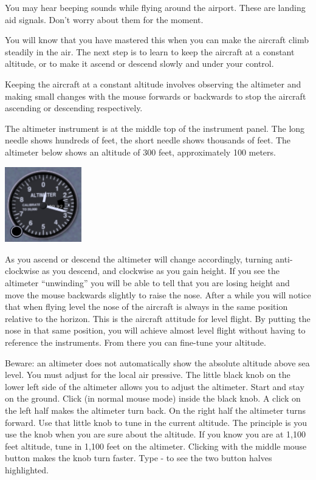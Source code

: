 You may hear beeping sounds while flying around the airport. These are
landing aid signals. Don't worry about them for the
moment.

You will know that you have mastered this when you can make the aircraft climb
steadily in the air. The next step is to learn to keep the aircraft at a 
constant altitude, or to make it ascend or descend slowly and under your 
control.

Keeping the aircraft at a constant altitude involves observing the altimeter
and making small changes with the mouse forwards or backwards to stop the 
aircraft ascending or descending respectively.

 The altimeter instrument is at the middle top of the 
instrument panel. The long needle shows hundreds of feet, the short needle 
shows thousands of feet. The altimeter below shows an altitude of
300 feet, approximately 100 meters.


\begin{center}
\includegraphics[width=0.25\textwidth]{img/tut_17}
\end{center}

As you ascend or descend the altimeter will change accordingly, turning 
anti-clockwise as you descend, and clockwise as you gain height. If you see
the altimeter ``unwinding'' you will be able to tell that you are losing height
and move the mouse backwards slightly to raise the nose.
After a while you will notice that when flying level the nose of the aircraft
is always in the same position relative to the horizon. This is the aircraft
attitude for level flight. By putting the nose in that same position, you will
achieve almost level flight without having to reference the instruments. From
there you can fine-tune your altitude.

Beware: an altimeter does not automatically show the absolute altitude
above sea level. You must adjust for the local air
pressive. The little black knob on the lower left side of the
altimeter allows you to adjust the altimeter. Start 
\FlightGear{} and stay on the ground. Click (in normal mouse mode) inside the 
black knob. A click on the left half makes the altimeter turn back. On the 
right half the altimeter turns forward. Use that little knob to tune in the 
current altitude. The principle is you use the knob when you are sure about 
the altitude. If you know you are at 1,100 feet altitude, tune in 1,100 feet 
on the altimeter. Clicking with the middle mouse button makes the knob
turn faster. Type - to see the two button halves
highlighted.

